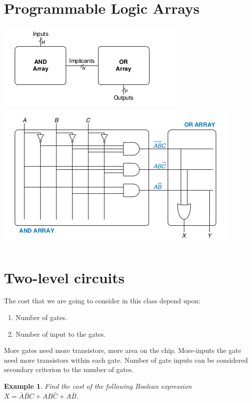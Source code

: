\documentclass{article}
\newtheorem{example}{Example}
\newcommand{\bA}{\bar{A}}
\newcommand{\bB}{\bar{B}}
\newcommand{\bC}{\bar{C}}
\begin{document}
\section{Programmable Logic Arrays}
\includegraphics[width=0.5\linewidth]{figures/PLA-abstract.png}
\includegraphics[width=0.5\linewidth]{figures/PLA-logic.png}

\section{Two-level circuits}
The cost that we are going to consider in this class depend upon:
\begin{enumerate}
\item Number of gates.
\item Number of input to the gates.
\end{enumerate}
More gates need more transistors, more area on the chip. More-inputs the gate
need more transistors within each gate. Number of gate inputs can be considered
secondary criterion to the number of gates.

\begin{example}
  Find the cost of the following Boolean expression $X = \bA\bB C + AB\bC + A\bB$.
\end{example}



%
%
\end{document}
